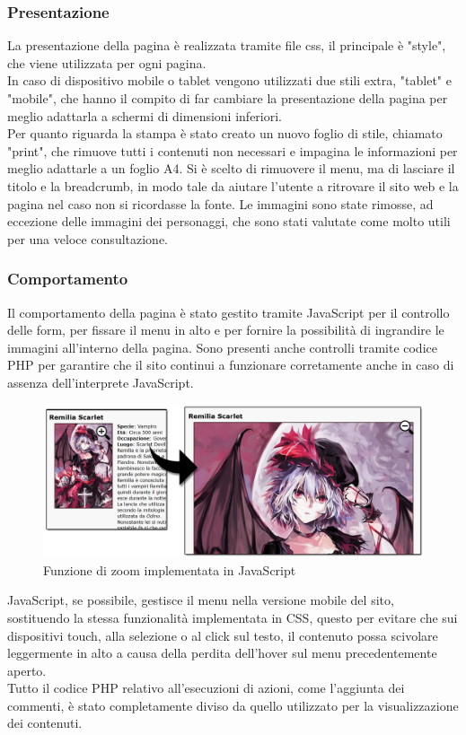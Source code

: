 \documentclass[openany, a4paper, 12pt]{report}
\begin{document}
			\subsubsection{Presentazione}
			La presentazione della pagina è realizzata tramite file css, il principale è "style", che viene utilizzata per ogni pagina.\\
			In caso di dispositivo mobile o tablet vengono utilizzati due stili extra, "tablet" e "mobile", che hanno il compito di far cambiare la presentazione della pagina per meglio adattarla a schermi di dimensioni inferiori.\\
			Per quanto riguarda la stampa è stato creato un nuovo foglio di stile, chiamato "print", che rimuove tutti i contenuti non necessari e impagina le informazioni per meglio adattarle a un foglio A4. Si è scelto di rimuovere il menu, ma di lasciare il titolo e la breadcrumb, in modo tale da aiutare l'utente a ritrovare il sito web e la pagina nel caso non si ricordasse la fonte. Le immagini sono state rimosse, ad eccezione delle immagini dei personaggi, che sono stati valutate come molto utili per una veloce consultazione.

			\subsubsection{Comportamento}
			Il comportamento della pagina è stato gestito tramite JavaScript per il controllo delle form, per fissare il menu in alto e per fornire la possibilità di ingrandire le immagini all'interno della pagina. Sono presenti anche controlli tramite codice PHP per garantire che il sito continui a funzionare corretamente anche in caso di assenza dell'interprete JavaScript.
			
			\begin{figure}[H]
				\centering
				\includegraphics[width=0.8\linewidth]{images/zomm}
				\caption{Funzione di zoom implementata in JavaScript}
			\end{figure}

			JavaScript, se possibile, gestisce il menu nella versione mobile del sito, sostituendo la stessa funzionalità implementata in CSS, questo per evitare che sui dispositivi touch, alla selezione o al click sul testo, il contenuto possa scivolare leggermente in alto a causa della perdita dell'hover sul menu precedentemente aperto.\\
			Tutto il codice PHP relativo all'esecuzioni di azioni, come l'aggiunta dei commenti, è stato completamente diviso da quello utilizzato per la visualizzazione dei contenuti.\\
\end{document}
